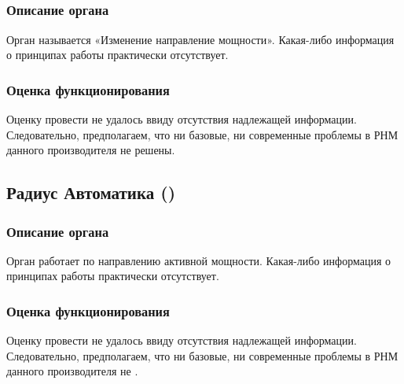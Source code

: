 \subsection{}

\subsubsection{Описание органа}

Орган называется «Изменение направление мощности». Какая-либо информация о принципах
работы практически отсутствует.

\subsubsection{Оценка функционирования}

Оценку провести не удалось ввиду отсутствия надлежащей информации. Следовательно,
предполагаем, что ни базовые, ни современные проблемы в РНМ данного производителя не
решены.

\subsection{Радиус Автоматика ()}

\subsubsection{Описание органа}

Орган работает по направлению активной мощности. Какая-либо информация о принципах
работы практически отсутствует.

\subsubsection{Оценка функционирования}

Оценку провести не удалось ввиду отсутствия надлежащей информации. Следовательно, предполагаем, что ни базовые, ни современные проблемы в РНМ данного производителя не .

